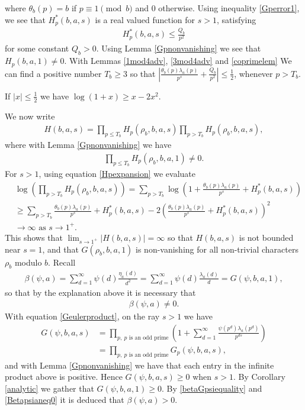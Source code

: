 \documentclass[12pt]{amsart}
\newcommand{\1}{\mathmybb{1}}
\begin{document}
where $\theta_{b}(p) = b$ if $p \equiv 1 \pmod b$ and $0$ otherwise. Using inequality \eqref{Gperror1}, we see that $H^{*}_{p}(b,a,s)$ is a real valued function for $s > 1$, satisfying 
\begin{align}
\label{Hperror}
H^{*}_{p}(b,a,s) \leq \frac{Q_{b}}{p^2}
\end{align}
 for some constant $Q_{b}>0$. Using Lemma \ref{Gpnonvanishing} we see that $H_{p}(b,a,1) \neq 0$. With Lemmas \ref{1mod4adv}, \ref{3mod4adv} and \ref{coprimelem} We can find a positive number $T_{b} \geq 3$ so that $|\frac{\theta_{b}(p)\lambda_{a}(p)}{p^s} + \frac{Q_{b}}{p^2}| \leq \frac{1}{2}$, whenever $p > T_{b}$.
\begin{lem}
\label{loglem}
If $|x| \leq \frac{1}{2}$ we have $\log(1+x) \geq x-2x^2$.
\end{lem}
We now write 
\begin{align*}
H(b,a,s) = \prod_{p \leq T_{b}}H_{p}(\rho_{b},b,a,s) \prod_{p > T_{b}}H_{p}(\rho_{b},b,a,s),
\end{align*}
where with Lemma \ref{Gpnonvanishing} we have
\begin{align*}
\prod_{p \leq T_{b}}H_{p}(\rho_{b},b,a,1) \neq 0.
\end{align*}
For $s > 1$, using equation \eqref{Hpexpansion} we evaluate
\begin{align*}
&\log(\prod_{p > T_{b}}H_{p}(\rho_{b},b,a,s)) = \sum_{p > T_{b}}\log\left(1 +\frac{\theta_{b}(p)\lambda_{a}(p)}{p^s} + H^{*}_{p}(b,a,s)\right)\\
&\geq \sum_{p > T_{b}} \frac{\theta_{b}(p)\lambda_{a}(p)}{p^s}+ H^{*}_{p}(b,a,s)-2\left(\frac{\theta_{b}(p)\lambda_{a}(p)}{p^s} + H^{*}_{p}(b,a,s)\right)^2\\
&\rightarrow \infty \text{ as }s\rightarrow 1^{+}.
\end{align*}
This shows that $\lim_{s \rightarrow 1^{+}}|H(b,a,s)|  = \infty$ so that $H(b,a,s)$ is not bounded near $s = 1$, and that $G(\rho_{b},b,a,1)$ is non-vanishing for all non-trivial characters $\rho_{b}$ modulo $b$. 
Recall
\begin{align}
\label{betaGpsiequality}
\beta(\psi,a) = \sum_{d= 1}^{\infty}\psi(d)\frac{\eta_{a}(d)}{d^2} = \sum_{d= 1}^{\infty}\psi(d)\frac{\lambda_{a}(d)}{d} = G(\psi,b,a,1) ,
\end{align}
so that by the explanation above it is necessary that
\begin{align}
\label{Betapsianeq0}
\beta(\psi,a) \neq 0.
\end{align}
With equation \ref{Geulerproduct}, on the ray $s>1$ we have
\begin{align*}
G(\psi,b,a,s) &= \prod_{p, \ p \text{ is an odd prime}}\left(1+\sum_{d=1}^{\infty}\frac{\psi(p^{d})\lambda_{a}(p^d)}{p^{ds}}\right)\\
&= \prod_{p, \ p \text{ is an odd prime}}G_{p}(\psi,b,a,s),
\end{align*}
and with Lemma \ref{Gpnonvanishing} we have that each entry in the infinite product above is positive. Hence $G(\psi,b,a,s)\geq 0$ when $s > 1$. By Corollary \ref{analytic} we gather that $G(\psi,b,a,1) \geq 0$. By \eqref{betaGpsiequality} and \eqref{Betapsianeq0} it is deduced that $\beta(\psi,a)>0$.
\end{document}
